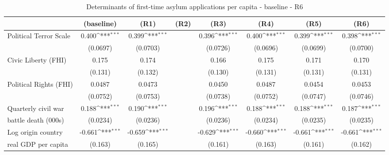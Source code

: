 \begin{table}[htbp]\centering
	 \footnotesize
	\def\sym#1{\ifmmode^{#1}\else\(^{#1}\)\fi}
	\caption{Determinants of first-time asylum applications per capita - baseline - R6}
	\begin{tabular}{l*{7}{c}}
		\hline\hline
		&\multicolumn{1}{c}{(baseline)}     &\multicolumn{1}{c}{(R1)}       &\multicolumn{1}{c}{(R2)}       &\multicolumn{1}{c}{(R3)}    	&\multicolumn{1}{c}{(R4)}  	&\multicolumn{1}{c}{(R5)}   &\multicolumn{1}{c}{(R6)}         	\\
\hline
Political Terror Scale&       0.400\sym{***}&       0.399\sym{***}&                     &       0.396\sym{***}&       0.400\sym{***}&       0.399\sym{***}&       0.398\sym{***}\\
                    &    (0.0697)         &    (0.0703)         &                     &    (0.0726)         &    (0.0696)         &    (0.0699)         &    (0.0700)         \\
[0,5em]
Civic Liberty (FHI) &       0.175         &       0.174         &                     &       0.166         &       0.175         &       0.171         &       0.170         \\
                    &     (0.131)         &     (0.132)         &                     &     (0.130)         &     (0.131)         &     (0.131)         &     (0.131)         \\
[0,5em]
Political Rights (FHI)&      0.0487         &      0.0473         &                     &      0.0450         &      0.0487         &      0.0454         &      0.0453         \\
                    &    (0.0752)         &    (0.0753)         &                     &    (0.0738)         &    (0.0752)         &    (0.0747)         &    (0.0746)         \\
[0,5em]
Quarterly civil war&       0.188\sym{***}&       0.190\sym{***}&                     &       0.196\sym{***}&       0.188\sym{***}&       0.188\sym{***}&       0.187\sym{***}\\
 battle death (000s)                    &    (0.0234)         &    (0.0236)         &                     &    (0.0236)         &    (0.0234)         &    (0.0235)         &    (0.0235)         \\
[0,5em]
Log origin country &      -0.661\sym{***}&      -0.659\sym{***}&                     &      -0.629\sym{***}&      -0.660\sym{***}&      -0.661\sym{***}&      -0.661\sym{***}\\
real GDP per capita                    &     (0.163)         &     (0.165)         &                     &     (0.161)         &     (0.163)         &     (0.161)         &     (0.162)         \\

\end{tabular}
\end{table}
